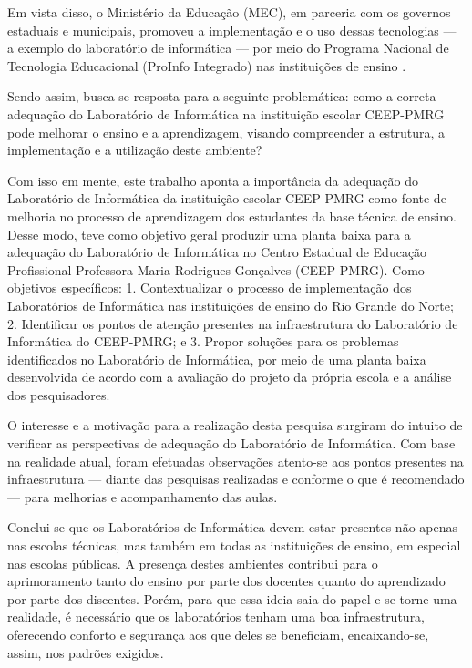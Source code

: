 \documentclass[12pt, openright, oneside, a4paper, brazil]{abntex2}
\begin{document}
	Em vista disso, o Ministério da Educação (MEC), em parceria com os governos estaduais e municipais, promoveu a implementação e o uso dessas tecnologias — a exemplo do laboratório de informática — por meio do Programa Nacional de Tecnologia Educacional (ProInfo Integrado) nas instituições de ensino \cite{lobler2012renote}.

	Sendo assim, busca-se resposta para a seguinte problemática: como a correta adequação do Laboratório de Informática na instituição escolar CEEP-PMRG pode melhorar o ensino e a aprendizagem, visando compreender a estrutura, a implementação e a utilização deste ambiente?

	Com isso em mente, este trabalho aponta a importância da adequação do Laboratório de Informática da instituição escolar CEEP-PMRG como fonte de melhoria no processo de aprendizagem dos estudantes da base técnica de ensino. Desse modo, teve como objetivo geral produzir uma planta baixa para a adequação do Laboratório de Informática no Centro Estadual de Educação Profissional Professora Maria Rodrigues Gonçalves (CEEP-PMRG). Como objetivos específicos: 1. Contextualizar o processo de implementação dos Laboratórios de Informática nas instituições de ensino do Rio Grande do Norte; 2. Identificar os pontos de atenção presentes na infraestrutura do Laboratório de Informática do CEEP-PMRG; e 3. Propor soluções para os problemas identificados no Laboratório de Informática, por meio de uma planta baixa desenvolvida de acordo com a avaliação do projeto da própria escola e a análise dos pesquisadores.

	O interesse e a motivação para a realização desta pesquisa surgiram do intuito de verificar as perspectivas de adequação do Laboratório de Informática. Com base na realidade atual, foram efetuadas observações atento-se aos pontos presentes na infraestrutura — diante das pesquisas realizadas e conforme o que é recomendado — para melhorias e acompanhamento das aulas.

	Conclui-se que os Laboratórios de Informática devem estar presentes não apenas nas escolas técnicas, mas também em todas as instituições de ensino, em especial nas escolas públicas. A presença destes ambientes contribui para o aprimoramento tanto do ensino por parte dos docentes quanto do aprendizado por parte dos discentes. Porém, para que essa ideia saia do papel e se torne uma realidade, é necessário que os laboratórios tenham uma boa infraestrutura, oferecendo conforto e segurança aos que deles se beneficiam, encaixando-se, assim, nos padrões exigidos.
\end{document}
